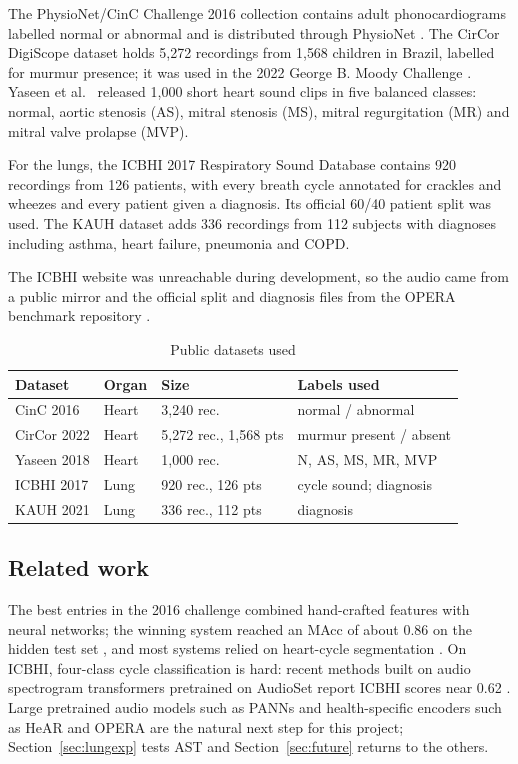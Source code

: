 \documentclass[conference]{IEEEtran}
\begin{document}
The PhysioNet/CinC Challenge 2016 collection \cite{liu2016,clifford2016} contains adult phonocardiograms labelled normal or abnormal and is distributed through PhysioNet \cite{goldberger2000}. The CirCor DigiScope dataset \cite{oliveira2022} holds 5{,}272 recordings from 1{,}568 children in Brazil, labelled for murmur presence; it was used in the 2022 George B. Moody Challenge \cite{reyna2023}. Yaseen et al.\ \cite{yaseen2018} released 1{,}000 short heart sound clips in five balanced classes: normal, aortic stenosis (AS), mitral stenosis (MS), mitral regurgitation (MR) and mitral valve prolapse (MVP).

For the lungs, the ICBHI 2017 Respiratory Sound Database \cite{rocha2018,rocha2019} contains 920 recordings from 126 patients, with every breath cycle annotated for crackles and wheezes and every patient given a diagnosis. Its official 60/40 patient split was used. The KAUH dataset \cite{fraiwan2021} adds 336 recordings from 112 subjects with diagnoses including asthma, heart failure, pneumonia and COPD.

The ICBHI website was unreachable during development, so the audio came from a public mirror and the official split and diagnosis files from the OPERA benchmark repository \cite{zhang2024opera}.

\begin{table}[t]
\caption{Public datasets used}
\label{tab:data}
\centering
\footnotesize
\begin{tabular}{@{}llll@{}}
\toprule
Dataset & Organ & Size & Labels used \\
\midrule
CinC 2016 \cite{liu2016} & Heart & 3{,}240 rec. & normal / abnormal \\
CirCor 2022 \cite{oliveira2022} & Heart & 5{,}272 rec., 1{,}568 pts & murmur present / absent \\
Yaseen 2018 \cite{yaseen2018} & Heart & 1{,}000 rec. & N, AS, MS, MR, MVP \\
ICBHI 2017 \cite{rocha2019} & Lung & 920 rec., 126 pts & cycle sound; diagnosis \\
KAUH 2021 \cite{fraiwan2021} & Lung & 336 rec., 112 pts & diagnosis \\
\bottomrule
\end{tabular}
\end{table}

\subsection{Related work}
The best entries in the 2016 challenge combined hand-crafted features with neural networks; the winning system reached an MAcc of about 0.86 on the hidden test set \cite{potes2016}, and most systems relied on heart-cycle segmentation \cite{springer2016}. On ICBHI, four-class cycle classification is hard: recent methods built on audio spectrogram transformers \cite{gong2021} pretrained on AudioSet \cite{gemmeke2017} report ICBHI scores near 0.62 \cite{bae2023}. Large pretrained audio models such as PANNs \cite{kong2020} and health-specific encoders such as HeAR \cite{baur2024} and OPERA \cite{zhang2024opera} are the natural next step for this project; Section~\ref{sec:lungexp} tests AST and Section~\ref{sec:future} returns to the others.
\end{document}
